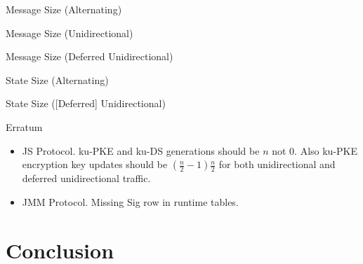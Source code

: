 \documentclass{beamer}
\begin{document}
\begin{frame}{Message Size (Alternating)}
   \begin{figure}[H]
    \centering
     
  \end{figure}
\end{frame}

\begin{frame}{Message Size (Unidirectional)}
   \begin{figure}[H]
    \centering
     
  \end{figure}
\end{frame}

\begin{frame}{Message Size (Deferred Unidirectional)}
   \begin{figure}[H]
    \centering
     
  \end{figure}
\end{frame}

\begin{frame}{State Size (Alternating)}
   \begin{figure}[H]
    \centering
     
  \end{figure}
\end{frame}

\begin{frame}{State Size ([Deferred] Unidirectional)}
   \begin{figure}[H]
    \centering
     
  \end{figure}
\end{frame}

\begin{frame}{Erratum}
  \begin{itemize}
  \item JS Protocol. ku-PKE and ku-DS generations should be $n$ not $0$. Also
    ku-PKE encryption key updates should be $(\frac{n}{2}-1)\frac{n}{2}$ for
    both unidirectional and deferred unidirectional traffic.
  \item JMM Protocol. Missing Sig row in runtime tables.
  \end{itemize}
\end{frame}

\section{Conclusion}
\label{sec:conclusion}
\end{document}

